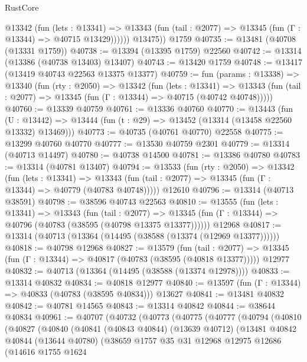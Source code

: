 \begin{lexlean}{RustCore}
\begin{coremodule}
            @13342
              (fun (lets : @13341) =>
              @13343 (fun (tail : @2077) => @13345 (fun (Γ : @13344) => @40715 @13429))))))
        @13475))
    @1759
@40735 := @13481 (@40708 (@13331 @1759))
@40738 := @13394 (@13395 @1759) @22560
@40742 := @13314 (@13386 (@40738 @13403) @13407)
@40743 := @13420 @1759
@40748 := @13417 (@13419 @40743 @22563 @13375 @13377)
@40759 := fun (params : @13338) =>
  @13340
    (fun (rty : @2050) =>
    @13342
      (fun (lets : @13341) =>
      @13343 (fun (tail : @2077) => @13345 (fun (Γ : @13344) => @40715 (@40742 @40748)))))
@40760 := @13339 @40759
@40761 := @13336 @40760
@40770 := @13443
    (fun (U : @13442) => @13444 (fun (t : @29) => @13452 (@13314 (@13458 @22560 @13332) @13469)))
@40773 := @40735 (@40761 @40770) @22558
@40775 := @13299 @40760 @40770
@40777 := @13530 @40759 @2301
@40779 := @13314 (@40713 @14497)
@40780 := @40738 @14500
@40781 := @13386 @40780
@40783 := @13314 (@40781 @13407)
@40794 := @13533
    (fun (rty : @2050) =>
    @13342
      (fun (lets : @13341) =>
      @13343 (fun (tail : @2077) => @13345 (fun (Γ : @13344) => @40779 (@40783 @40748)))))
    @12610
@40796 := @13314 (@40713 @38591)
@40798 := @38596 @40743 @22563
@40810 := @13555
    (fun (lets : @13341) =>
    @13343
      (fun (tail : @2077) =>
      @13345 (fun (Γ : @13344) => @40796 (@40783 (@38595 (@40798 @13375 @13377))))))
    @12968
@40817 := @13314 (@40713 (@13364 (@14495 (@38588 (@13374 (@12969 @13377))))))
@40818 := @40798 @12968
@40827 := @13579
    (fun (tail : @2077) => @13345 (fun (Γ : @13344) => @40817 (@40783 (@38595 (@40818 @13377)))))
    @12977
@40832 := @40713 (@13364 (@14495 (@38588 (@13374 @12978))))
@40833 := @13314 @40832
@40834 := @40818 @12977
@40840 := @13597 (fun (Γ : @13344) => @40833 (@40783 (@38595 @40834))) @13627
@40841 := @13481 @40832
@40842 := @40781 @14565
@40843 := @13314 @40842
@40844 := @38644 @40834
@40961 := @40707
    (@40732
      (@40773
        (@40775
          (@40777
            (@40794
              (@40810
                (@40827
                  (@40840
                    (@40841
                      (@40843 @40844)
                      (@13639 @40712)
                      (@13481
                        @40842
                        @40844
                        (@13644 @40780)
                        (@38659
                          @1757
                          @35
                          @31
                          @12968
                          @12975
                          @12686
                          (@14616
                            @1755
                            @1624

\end{coremodule}
\end{lexlean}
